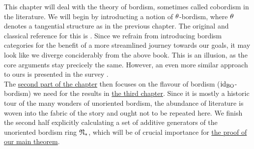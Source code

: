 This chapter will deal with the theory of bordism, sometimes called cobordism in the literature.
We will begin by introducting a notion of $\theta$-bordism, where $\theta$ denotes a tangential structure as in the previous chapter.
The original and classical reference for this is \cite{stong:cc}.
Since we refrain from introducing bordism categories for the benefit of a more streamlined journey towards our goals, it may look like we diverge conciderably from the above book.
This is an illusion, as the core arguments stay precicely the same.
However, an even more similar approach to ours is presented in the survey \cite{milnor:bord}.\\
The \hyperlink{subsection.2.2}{second part of the chapter} then focuses on the flavour of bordism ($\operatorname{id}_{\mathrm{BO}}$-bordism) we need for the results in \hyperref[sec:psc]{the third chapter}. 
Since it is mostly a historic tour of the many wonders of unoriented bordism, the abundance of literature is woven into the fabric of the story and ought not to be repeated here.
We finish the second half explicitly calculating a set of additive generators of the unoriented bordism ring $\mathfrak{N}_\ast$, which will be of crucial importance for \hyperlink{subsection.3.2}{the proof of our main theorem}.

